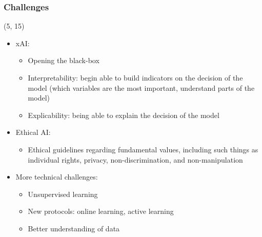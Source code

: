 \begin{frame}
  \frametitle{Challenges}

  \begin{textblock}{90}(5, 15)
    \begin{itemize}
    \item<1-> \acf{xAI}:
      \begin{itemize}
      \item Opening the black-box
      \item Interpretability: begin able to build indicators on the decision of the model
        (which variables are the most important, understand parts of the model)
      \item Explicability: being able to explain the decision of the model
      \end{itemize}
    \item<2-> Ethical \ac{AI}:
      \begin{itemize}
      \item Ethical guidelines regarding fundamental values, including such things as individual rights, privacy, non-discrimination, and non-manipulation
      \end{itemize}
    \item<3-> More technical challenges:
      \begin{itemize}
      \item Unsupervised learning
      \item New protocols: online learning, active learning
      \item Better understanding of data
      \end{itemize}
    \end{itemize}
  \end{textblock}
\end{frame}
